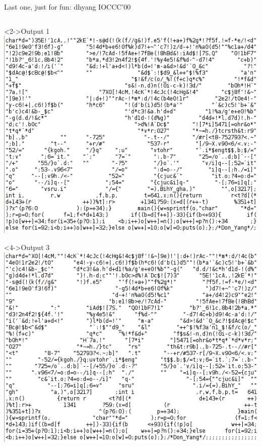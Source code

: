 \begin{frame}[t]{Last one, just for fun: dhyang IOCCC'00}
\begin{columns}
    \begin{column}{.3\linewidth}\vspace{-\baselineskip}
      \begin{block}<2->{Output 1}\medskip
        \includegraphics[width=\linewidth]{img/dhyang2.png}        
      \end{block}
      \begin{block}<4->{Output 3}\medskip
        \includegraphics[width=\linewidth]{img/dhyang4.png}        
      \end{block}
    \end{column}


\end{columns}
\end{frame}
